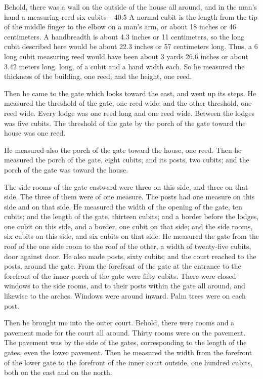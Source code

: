  Behold, there was a wall on the outside of the house all
around, and in the man's hand a measuring reed six cubits+ 40:5 A normal
cubit is the length from the tip of the middle finger to the elbow on a
man's arm, or about 18 inches or 46 centimeters. A handbreadth is about
4.3 inches or 11 centimeters, so the long cubit described here would be
about 22.3 inches or 57 centimeters long. Thus, a 6 long cubit measuring
reed would have been about 3 yards 26.6 inches or about 3.42 meters
long. long, of a cubit and a hand width each. So he measured the
thickness of the building, one reed; and the height, one reed.

 Then he came to the gate which looks toward the east, and
went up its steps. He measured the threshold of the gate, one reed wide;
and the other threshold, one reed wide.  Every lodge was one
reed long and one reed wide. Between the lodges was five cubits. The
threshold of the gate by the porch of the gate toward the house was one
reed.

 He measured also the porch of the gate toward the house,
one reed.  Then he measured the porch of the gate, eight
cubits; and its posts, two cubits; and the porch of the gate was toward
the house.

 The side rooms of the gate eastward were three on this
side, and three on that side. The three of them were of one measure. The
posts had one measure on this side and on that side.  He
measured the width of the opening of the gate, ten cubits; and the
length of the gate, thirteen cubits;  and a border before
the lodges, one cubit on this side, and a border, one cubit on that
side; and the side rooms, six cubits on this side, and six cubits on
that side.  He measured the gate from the roof of the one
side room to the roof of the other, a width of twenty-five cubits, door
against door.  He also made posts, sixty cubits; and the
court reached to the posts, around the gate.  From the
forefront of the gate at the entrance to the forefront of the inner
porch of the gate were fifty cubits.  There were closed
windows to the side rooms, and to their posts within the gate all
around, and likewise to the arches. Windows were around inward. Palm
trees were on each post.

 Then he brought me into the outer court. Behold, there
were rooms and a pavement made for the court all around. Thirty rooms
were on the pavement.  The pavement was by the side of the
gates, corresponding to the length of the gates, even the lower
pavement.  Then he measured the width from the forefront of
the lower gate to the forefront of the inner court outside, one hundred
cubits, both on the east and on the north.

